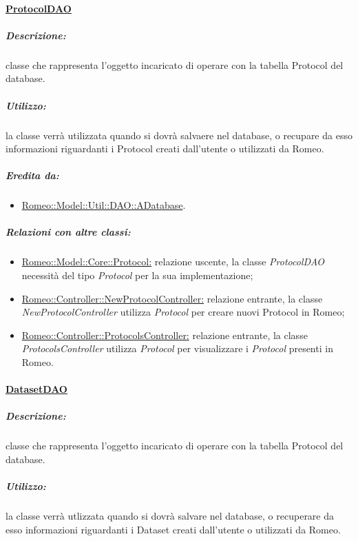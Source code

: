 		\paragraph{\underline{ProtocolDAO}}
			\label{dao::protocoldao} 
			
				\subparagraph{Descrizione:} classe che rappresenta l’oggetto incaricato di operare con la tabella Protocol del database.
				
				\subparagraph{Utilizzo:} la classe verrà utilizzata quando si dovrà salvaere nel database, o recupare da esso informazioni riguardanti i Protocol\g{} creati dall'utente o utilizzati da Romeo\g{}.
				
				\subparagraph{Eredita da:}
					\begin{itemize}
						\item \hyperref[romeo::model::util::dao]{Romeo::Model::Util::DAO::ADatabase}.			
					\end{itemize}
					
				\subparagraph{Relazioni con altre classi:}
					\begin{itemize}
					
						\item \hyperref[]{Romeo::Model::Core::Protocol:} relazione uscente, la classe \textsl{ProtocolDAO} necessità del tipo \textsl{Protocol} per la sua implementazione;
						
						\item \hyperref[]{Romeo::Controller::NewProtocolController:} relazione entrante, la classe \textsl{NewProtocolController} utilizza \textsl{Protocol} per creare nuovi Protocol\g{} in Romeo\g{};
						
						\item \hyperref[]{Romeo::Controller::ProtocolsController:} relazione entrante, la classe \textsl{ProtocolsController} utilizza \textsl{Protocol} per visualizzare i \textsl{Protocol} presenti in Romeo\g{}.
					\end{itemize}
				
		\paragraph{\underline{DatasetDAO}}
		\label{dao::datasetdao} 
		
			\subparagraph{Descrizione:}  classe che rappresenta l’oggetto incaricato di operare con la tabella Protocol del database.
			
			\subparagraph{Utilizzo:} la classe verrà utlizzata quando si dovrà salvare nel database, o recuperare da esso informazioni riguardanti i Dataset\g{} creati dall'utente o utilizzati da Romeo\g{}.
							
